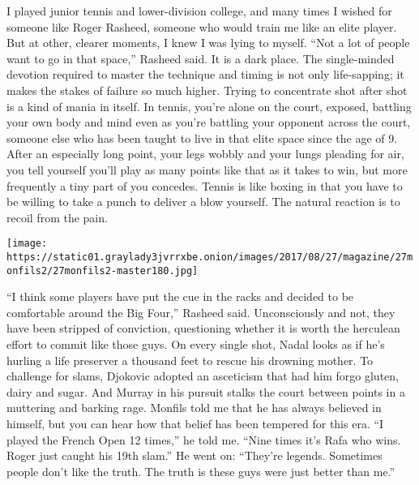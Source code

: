 I played junior tennis and lower-division college, and many times I
wished for someone like Roger Rasheed, someone who would train me like
an elite player. But at other, clearer moments, I knew I was lying to
myself. ``Not a lot of people want to go in that space,'' Rasheed said.
It is a dark place. The single-minded devotion required to master the
technique and timing is not only life-sapping; it makes the stakes of
failure so much higher. Trying to concentrate shot after shot is a kind
of mania in itself. In tennis, you're alone on the court, exposed,
battling your own body and mind even as you're battling your opponent
across the court, someone else who has been taught to live in that elite
space since the age of 9. After an especially long point, your legs
wobbly and your lungs pleading for air, you tell yourself you'll play as
many points like that as it takes to win, but more frequently a tiny
part of you concedes. Tennis is like boxing in that you have to be
willing to take a punch to deliver a blow yourself. The natural reaction
is to recoil from the pain.

\texttt{[image: https://static01.graylady3jvrrxbe.onion/images/2017/08/27/magazine/27monfils2/27monfils2-master180.jpg]}

``I think some players have put the cue in the racks and decided to be
comfortable around the Big Four,'' Rasheed said. Unconsciously and not,
they have been stripped of conviction, questioning whether it is worth
the herculean effort to commit like those guys. On every single shot,
Nadal looks as if he's hurling a life preserver a thousand feet to
rescue his drowning mother. To challenge for slams, Djokovic adopted an
asceticism that had him forgo gluten, dairy and sugar. And Murray in his
pursuit stalks the court between points in a muttering and barking rage.
Monfils told me that he has always believed in himself, but you can hear
how that belief has been tempered for this era. ``I played the French
Open 12 times,'' he told me. ``Nine times it's Rafa who wins. Roger just
caught his 19th slam.'' He went on: ``They're legends. Sometimes people
don't like the truth. The truth is these guys were just better than
me.''

